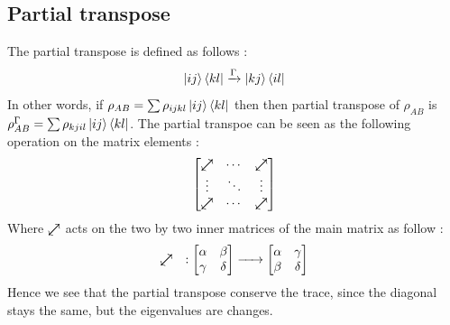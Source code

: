 \documentclass{article}
\newcommand{\neswarrow}{\mathrel{\text{$\nearrow$\llap{$\swarrow$}}}}
\begin{document}
\subsection{Partial transpose}
The partial transpose is defined as follows :
\begin{equation}
    \ket{ij}\bra{kl} \xrightarrow{\Gamma} \ket{kj}\bra{il}
\end{equation}
In other words, if $\rho_{AB} = \sum \rho_{ijkl}\ket{ij}\bra{kl}$
then then partial transpose of $\rho_{AB}$ is
$\rho_{AB}^\Gamma = \sum \rho_{kjil}\ket{ij}\bra{kl}$.
The partial transpoe can be seen as the following operation
on the matrix elements :
\begin{equation}
    \begin{bmatrix}
        \neswarrow & \cdots & \neswarrow \\
        \vdots & \ddots & \vdots \\
        \neswarrow & \cdots & \neswarrow \\
    \end{bmatrix}
\end{equation}
Where $\neswarrow$ acts on the two by two inner matrices of the main matrix as
follow :
\begin{equation}
    \neswarrow \quad :
    \begin{bmatrix}
        \alpha & \beta \\ \gamma & \delta
    \end{bmatrix}
    \xrightarrow{\hspace*{0.5cm}}
    \begin{bmatrix}
        \alpha & \gamma \\ \beta & \delta
    \end{bmatrix}
\end{equation}
Hence we see that the partial transpose conserve the trace, since the diagonal
stays the same, but the eigenvalues are changes.
\end{document}
